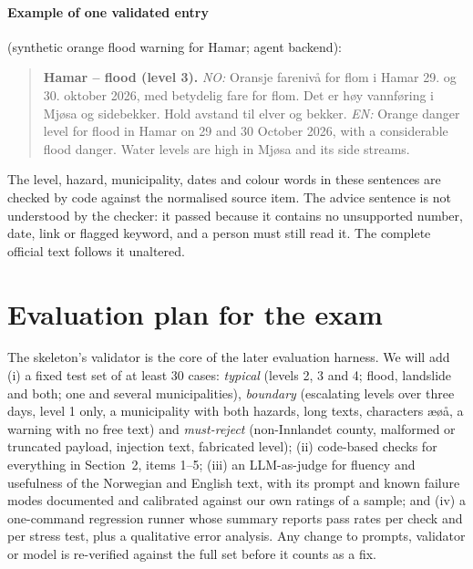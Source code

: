 \documentclass{article}
\begin{document}
\paragraph{Example of one validated entry} (synthetic orange flood warning for Hamar; agent backend):
\begin{quote}\small
\textbf{Hamar -- flood (level 3).} \emph{NO:} Oransje farenivå for flom i Hamar 29. og 30. oktober 2026, med betydelig fare for flom. Det er høy vannføring i Mjøsa og sidebekker. Hold avstand til elver og bekker. \emph{EN:} Orange danger level for flood in Hamar on 29 and 30 October 2026, with a considerable flood danger. Water levels are high in Mjøsa and its side streams.
\end{quote}
The level, hazard, municipality, dates and colour words in these sentences are checked by code against the normalised source item. The advice sentence is not understood by the checker: it passed because it contains no unsupported number, date, link or flagged keyword, and a person must still read it. The complete official text follows it unaltered.

\section{Evaluation plan for the exam}
The skeleton's validator is the core of the later evaluation harness. We will add (i) a fixed test set of at least 30 cases: \emph{typical} (levels 2, 3 and 4; flood, landslide and both; one and several municipalities), \emph{boundary} (escalating levels over three days, level 1 only, a municipality with both hazards, long texts, characters {\ae}{\o}{\aa}, a warning with no free text) and \emph{must-reject} (non-Innlandet county, malformed or truncated payload, injection text, fabricated level); (ii) code-based checks for everything in Section~2, items 1--5; (iii) an LLM-as-judge for fluency and usefulness of the Norwegian and English text, with its prompt and known failure modes documented and calibrated against our own ratings of a sample; and (iv) a one-command regression runner whose summary reports pass rates per check and per stress test, plus a qualitative error analysis. Any change to prompts, validator or model is re-verified against the full set before it counts as a fix.
\end{document}

